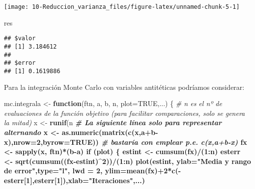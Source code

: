 \documentclass[
]{book}
\newenvironment{Shaded}{\begin{snugshade}}{\end{snugshade}}
\newcommand{\CommentTok}[1]{\textcolor[rgb]{0.56,0.35,0.01}{\textit{#1}}}
\newcommand{\ControlFlowTok}[1]{\textcolor[rgb]{0.13,0.29,0.53}{\textbf{#1}}}
\newcommand{\DataTypeTok}[1]{\textcolor[rgb]{0.13,0.29,0.53}{#1}}
\newcommand{\DecValTok}[1]{\textcolor[rgb]{0.00,0.00,0.81}{#1}}
\newcommand{\KeywordTok}[1]{\textcolor[rgb]{0.13,0.29,0.53}{\textbf{#1}}}
\newcommand{\NormalTok}[1]{#1}
\newcommand{\OperatorTok}[1]{\textcolor[rgb]{0.81,0.36,0.00}{\textbf{#1}}}
\newcommand{\OtherTok}[1]{\textcolor[rgb]{0.56,0.35,0.01}{#1}}
\newcommand{\StringTok}[1]{\textcolor[rgb]{0.31,0.60,0.02}{#1}}
\theoremstyle{break}
\theoremstyle{definition}
\theoremstyle{definition}
\theoremstyle{definition}
\theoremstyle{remark}
\begin{document}
\begin{center}\texttt{[image: 10-Reduccion\_varianza\_files/figure-latex/unnamed-chunk-5-1]} \end{center}

\begin{Shaded}
\begin{Highlighting}[]
\NormalTok{res}
\end{Highlighting}
\end{Shaded}

\begin{verbatim}
## $valor
## [1] 3.184612
## 
## $error
## [1] 0.1619886
\end{verbatim}

Para la integración Monte Carlo con variables antitéticas podríamos considerar:

\begin{Shaded}
\begin{Highlighting}[]
\NormalTok{mc.integrala <-}\StringTok{ }\ControlFlowTok{function}\NormalTok{(ftn, a, b, n, }\DataTypeTok{plot=}\OtherTok{TRUE}\NormalTok{,...) \{}
  \CommentTok{# n es el nº de evaluaciones de la función objetivo (para facilitar comparaciones, solo se genera la mitad)}
\NormalTok{  x <-}\StringTok{ }\KeywordTok{runif}\NormalTok{(n}\OperatorTok{%/%}\DecValTok{2}\NormalTok{, a, b)}
  \CommentTok{# La siguiente línea solo para representar alternando}
\NormalTok{  x <-}\StringTok{ }\KeywordTok{as.numeric}\NormalTok{(}\KeywordTok{matrix}\NormalTok{(}\KeywordTok{c}\NormalTok{(x,a}\OperatorTok{+}\NormalTok{b}\OperatorTok{-}\NormalTok{x),}\DataTypeTok{nrow=}\DecValTok{2}\NormalTok{,}\DataTypeTok{byrow=}\OtherTok{TRUE}\NormalTok{))}
  \CommentTok{# bastaría con emplear p.e. c(x,a+b-x)}
\NormalTok{  fx <-}\StringTok{ }\KeywordTok{sapply}\NormalTok{(x, ftn)}\OperatorTok{*}\NormalTok{(b}\OperatorTok{-}\NormalTok{a)}
  \ControlFlowTok{if}\NormalTok{ (plot) \{}
\NormalTok{    estint <-}\StringTok{ }\KeywordTok{cumsum}\NormalTok{(fx)}\OperatorTok{/}\NormalTok{(}\DecValTok{1}\OperatorTok{:}\NormalTok{n)}
\NormalTok{    esterr <-}\StringTok{ }\KeywordTok{sqrt}\NormalTok{(}\KeywordTok{cumsum}\NormalTok{((fx}\OperatorTok{-}\NormalTok{estint)}\OperatorTok{^}\DecValTok{2}\NormalTok{))}\OperatorTok{/}\NormalTok{(}\DecValTok{1}\OperatorTok{:}\NormalTok{n)}
    \KeywordTok{plot}\NormalTok{(estint, }\DataTypeTok{ylab=}\StringTok{"Media y rango de error"}\NormalTok{,}\DataTypeTok{type=}\StringTok{"l"}\NormalTok{, }\DataTypeTok{lwd =} \DecValTok{2}\NormalTok{,}
         \DataTypeTok{ylim=}\KeywordTok{mean}\NormalTok{(fx)}\OperatorTok{+}\DecValTok{2}\OperatorTok{*}\KeywordTok{c}\NormalTok{(}\OperatorTok{-}\NormalTok{esterr[}\DecValTok{1}\NormalTok{],esterr[}\DecValTok{1}\NormalTok{]),}\DataTypeTok{xlab=}\StringTok{"Iteraciones"}\NormalTok{,...)}
}
\end{Highlighting}
\end{Shaded}
\end{document}
